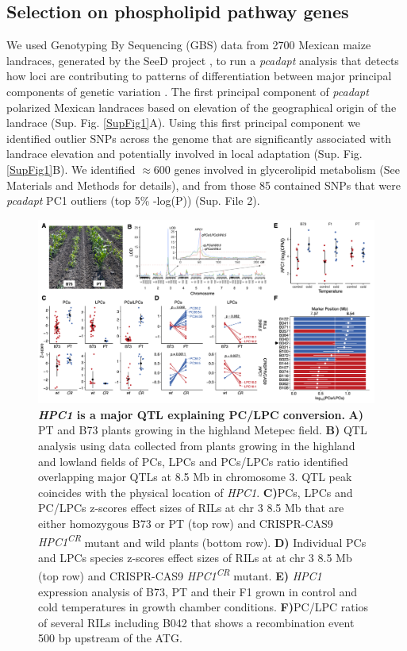 \documentclass[9pt,twocolumn,twoside,lineno]{BioRxiv}
\begin{document}
\subsection{Selection on phospholipid pathway genes} 
We used Genotyping By Sequencing (GBS) data from 2700 Mexican maize landraces, generated by the SeeD project \cite{Romero_Navarro2017-cn, Gates2019-xu}, to run a \textit{pcadapt} analysis that detects how loci are contributing to patterns of differentiation between major principal components of genetic variation \cite{Luu2017-ws}.
The first principal component of \textit{pcadapt} polarized Mexican landraces based on elevation of the geographical origin of the landrace (Sup. Fig. \ref{SupFig1}A).
Using this first principal component we identified outlier SNPs across the genome that are significantly associated with landrace elevation and potentially involved in local adaptation (Sup. Fig. \ref{SupFig1}B).
We identified $\approx 600$ genes involved in glycerolipid metabolism (See Materials and Methods for details), and from those 85 contained SNPs that were \textit{pcadapt} PC1 outliers (top 5\% -log(P)) (Sup. File 2).
\begin{figure}[!ht]
\begin{center}
\includegraphics[width=0.8\paperwidth]{Figures/Fig_3.png}
\caption{\textbf{\textit{HPC1} is a major QTL explaining PC/LPC conversion.} 
\textbf{A)} PT and B73 plants growing in the highland Metepec field. 
\textbf{B)} QTL analysis using data collected from plants growing in the highland and lowland fields of PCs, LPCs and PCs/LPCs ratio identified overlapping major QTLs at 8.5 Mb in chromosome 3. 
QTL peak coincides with the physical location of \textit{HPC1}. 
\textbf{C)}PCs, LPCs and PC/LPCs z-scores effect sizes of RILs at chr 3 8.5 Mb that are either homozygous B73 or PT (top row) and CRISPR-CAS9 \textit{HPC1\textsuperscript{CR}} mutant and wild plants (bottom row).        
\textbf{D)} Individual PCs and LPCs species z-scores effect sizes of RILs at at chr 3 8.5 Mb (top row) and CRISPR-CAS9 \textit{HPC1\textsuperscript{CR}} mutant.
\textbf{E)} \textit{HPC1} expression analysis of B73, PT and their F1 grown in control and cold temperatures in growth chamber conditions.
\textbf{F)}PC/LPC ratios of several RILs including B042 that shows a recombination event 500 bp upstream of the ATG.}
\label{Fig3}
\end{center}
\end{figure} 
\end{document}
